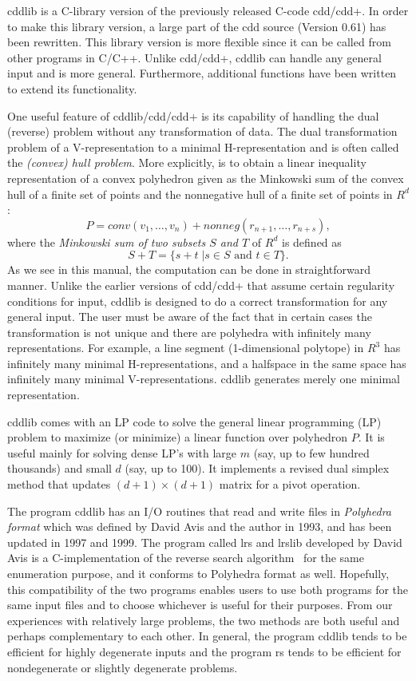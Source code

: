 \documentclass[11pt]{article}
\newcommand {\0} {{\bf 0}}
\begin{document}
cddlib is a C-library version of the previously released C-code cdd/cdd+.
In order to make this library version, a large part of the cdd source
(Version 0.61) has been rewritten.
This library version is more flexible since it can be called from other programs in C/C++.
Unlike cdd/cdd+, cddlib can handle any general input and is more general.
Furthermore,  additional functions have been written to extend its functionality.

One useful feature of  cddlib/cdd/cdd+ is its capability
of handling the dual (reverse)  problem without any transformation
of data.  The dual transformation problem of a V-representation
to a minimal H-representation and is often called the
{\em (convex) hull problem\/}.  More explicitly,
is to obtain a linear inequality representation
of a convex polyhedron given as the Minkowski sum of
the convex hull of a finite set of points and the nonnegative
hull of a finite set of points in $R^{d}$:
\[
P = conv(v_1,\ldots,v_n) +  nonneg(r_{n+1},\ldots,r_{n+s}),
\]
where
 the {\em Minkowski sum of two subsets $S$ and $T$} of $R^{d}$ is defined
as
\[
S + T = \{ s + t \; |  s \in S \mbox{ and } t \in T \}.
\]
As we see in this manual, the computation can be done
in straightforward manner.  Unlike the earlier versions of
cdd/cdd+ that assume certain regularity conditions for input,
cddlib is designed to do a correct transformation for any general input.
The user must be aware of the fact that in certain cases the
transformation is not unique and there are polyhedra with
infinitely many representations.  For example, a line
segment (1-dimensional polytope) in $R^3$ has infinitely
many minimal H-representations, and a halfspace in the same space
has infinitely many minimal V-representations.  cddlib generates
merely one minimal representation.

cddlib comes with an LP code to solve the general
linear programming (LP) problem to maximize (or minimize) a linear
function over polyhedron $P$.   It is useful mainly for solving
dense LP's with large $m$ (say, up to few hundred thousands) and small $d$
(say, up to 100).  It implements a revised dual simplex method that
updates $(d+1)\times (d+1)$ matrix for a pivot operation.

The program cddlib has an I/O routines that read and write files in
{\em Polyhedra format\/} which was defined by David Avis and
the author in 1993, and has been updated in 1997 and 1999.
The program called lrs and lrslib \cite{a-lrshome-01} developed by David Avis is
a C-implementation of the reverse search algorithm~\cite{af-pachv-92}
for the same enumeration purpose, and it conforms to Polyhedra format as well.
Hopefully, this compatibility of the two programs
enables users to use both programs for the same input files
and to choose whichever is useful for their purposes.
From our experiences with relatively large problems,
the two methods are both useful and perhaps complementary
to each other.  In general, the program cddlib tends to be
efficient for highly degenerate inputs and the program rs
tends to be efficient for nondegenerate or slightly
degenerate problems.
\end{document}
